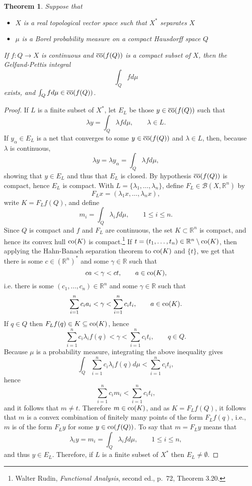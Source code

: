 \documentclass{article}
\newcommand{\co}{\ensuremath\mathrm{co}}
\newcommand{\cco}{\overline{\ensuremath\mathrm{co}}}
\newtheorem{theorem}{Theorem}
\theoremstyle{definition}
\begin{document}
\begin{theorem}
Suppose that
\begin{itemize} 
\item $X$ is a real topological vector space such that $X^*$ separates $X$
\item $\mu$ is a Borel probability measure on a compact Hausdorff space $Q$
\end{itemize}
If $f:Q \to X$ is continuous and $\cco(f(Q))$ is a compact subset of $X$, then the Gelfand-Pettis integral 
\[
\int_Q f d\mu
\]
exists, and $\int_Q f d\mu \in \cco(f(Q))$.
\label{VVI}
\end{theorem}
\begin{proof}
If  $L$ is a finite subset of $X^*$, let $E_L$ be those
$y \in \cco(f(Q))$ such that
\[
\lambda y =\int_Q \lambda f d\mu, \qquad \lambda \in L.
\]
If $y_\alpha \in E_L$ is a net that converges to some $y \in \cco(f(Q))$ and $\lambda \in L$, then, because $\lambda$
is continuous,
\[
\lambda y = \lambda y_\alpha = \int_Q \lambda f d\mu,
\]
showing that $y \in E_L$ and thus that $E_L$ is closed. By hypothesis $\cco(f(Q))$ is compact, hence $E_L$ is compact. 
With $L=\{\lambda_1,\ldots,\lambda_n\}$, define $F_L \in \mathscr{B}(X, \mathbb{R}^n)$ by
\[
F_L x=(\lambda_1 x,\ldots,\lambda_n x),
\]
 write $K=F_L f(Q)$, and define 
 \[
 m_i = \int_Q \lambda_i f d\mu,\qquad 1 \leq i \leq n.
 \]
 Since $Q$ is compact and $f$ and $F_L$ are continuous, the set $K \subset \mathbb{R}^n$ is compact, and hence its convex hull
 $\co(K)$ is compact.\footnote{Walter
Rudin, {\em Functional Analysis}, second ed., p.~72, Theorem 3.20.} 
 If $t=(t_1,\ldots,t_n) \in \mathbb{R}^n \setminus \co(K)$, then applying the Hahn-Banach separation theorem to 
 $\co(K)$ and $\{t\}$, we get that there is some $c \in (\mathbb{R}^n)^*$ and some $\gamma \in \mathbb{R}$ such that
 \[
 c a < \gamma  < c t, \qquad a \in \co(K),
 \]
 i.e. there is some $(c_1,\ldots,c_n) \in \mathbb{R}^n$ and some $\gamma \in \mathbb{R}$ such that
 \[
 \sum_{i=1}^n c_i a_i < \gamma < \sum_{i=1}^n c_i t_i, \qquad a \in \co(K).
 \]
If $q \in Q$ then $F_L f(q) \in K \subseteq \co(K)$, hence
\[
\sum_{i=1}^n c_i \lambda_i f(q) < \gamma <\sum_{i=1}^n c_i t_i, \qquad q \in Q.
\]
Because $\mu$ is a probability measure, integrating the above inequality gives
\[
\int_Q \sum_{i=1}^n c_i \lambda_i f(q) d\mu < \sum_{i=1}^n c_i t_i,
\]
hence
\[
\sum_{i=1}^n c_i m_i < \sum_{i=1}^n c_i t_i,
\]
and it follows that $m \neq t$. Therefore $m \in \co(K)$, and as $K=F_L f(Q)$, it follows that $m$ is a convex combination of finitely
many points of the form $F_L f(q)$, i.e., $m$ is of the form $F_L y$ for some $y \in \co(f(Q))$. 
To say that $m=F_L y$ means that
\[
\lambda_i y=m_i=\int_Q \lambda_i f d\mu, \qquad 1 \leq i \leq n,
\]
and thus $y \in E_L$. Therefore, if $L$ is a finite subset of $X^*$ then $E_L \neq \emptyset$.


\end{proof}
\end{document}
